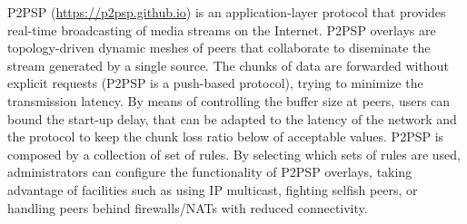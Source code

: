 

P2PSP (\url{https://p2psp.github.io}) is an application-layer protocol
that provides real-time broadcasting of media streams on the
Internet. P2PSP overlays are topology-driven dynamic meshes of peers
that collaborate to diseminate the stream generated by a single
source. The chunks of data are forwarded without explicit requests
(P2PSP is a push-based protocol), trying to minimize the transmission
latency. By means of controlling the buffer size at peers, users can
bound the start-up delay, that can be adapted to the latency of the
network and the protocol to keep the chunk loss ratio below of
acceptable values. P2PSP is composed by a collection of set of
rules. By selecting which sets of rules are used, administrators can
configure the functionality of P2PSP overlays, taking advantage of
facilities such as using IP multicast, fighting selfish peers, or
handling peers behind firewalls/NATs with reduced connectivity.
